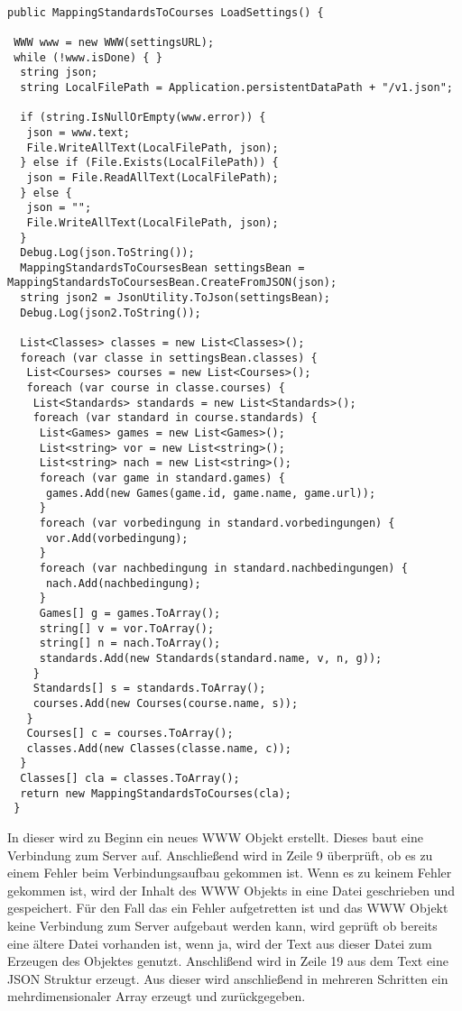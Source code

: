 \begin{scriptsize}
\lstset{
	float,
	caption=Methode LoadSettings, 
	language=[Sharp]C, 
	frame=single,  
	showstringspaces=false, 
	showspaces=false, 
	numbers=left, 
	captionpos=b, 
	belowcaptionskip=4pt,
	basicstyle=\ttfamily
} 
\begin{lstlisting}[label=lst:methode3]

public MappingStandardsToCourses LoadSettings() {

 WWW www = new WWW(settingsURL);
 while (!www.isDone) { }
  string json;
  string LocalFilePath = Application.persistentDataPath + "/v1.json";

  if (string.IsNullOrEmpty(www.error)) {
   json = www.text;
   File.WriteAllText(LocalFilePath, json);
  } else if (File.Exists(LocalFilePath)) {
   json = File.ReadAllText(LocalFilePath);
  } else {
   json = "";                
   File.WriteAllText(LocalFilePath, json);
  }
  Debug.Log(json.ToString());
  MappingStandardsToCoursesBean settingsBean = MappingStandardsToCoursesBean.CreateFromJSON(json);
  string json2 = JsonUtility.ToJson(settingsBean);
  Debug.Log(json2.ToString());

  List<Classes> classes = new List<Classes>();
  foreach (var classe in settingsBean.classes) {
   List<Courses> courses = new List<Courses>();
   foreach (var course in classe.courses) {
    List<Standards> standards = new List<Standards>();
    foreach (var standard in course.standards) {
     List<Games> games = new List<Games>();
     List<string> vor = new List<string>();
     List<string> nach = new List<string>();
     foreach (var game in standard.games) {
      games.Add(new Games(game.id, game.name, game.url));
     }
     foreach (var vorbedingung in standard.vorbedingungen) {
      vor.Add(vorbedingung);
     }
     foreach (var nachbedingung in standard.nachbedingungen) {
      nach.Add(nachbedingung);
     }
     Games[] g = games.ToArray();
     string[] v = vor.ToArray();
     string[] n = nach.ToArray();
     standards.Add(new Standards(standard.name, v, n, g));
    }
    Standards[] s = standards.ToArray();
    courses.Add(new Courses(course.name, s));
   }
   Courses[] c = courses.ToArray();
   classes.Add(new Classes(classe.name, c));
  }
  Classes[] cla = classes.ToArray();
  return new MappingStandardsToCourses(cla);
 }
\end{lstlisting}
\end{scriptsize}

In dieser wird zu Beginn ein neues WWW Objekt erstellt. Dieses baut eine Verbindung zum Server auf. Anschließend wird in Zeile 9 überprüft, ob es zu einem Fehler beim Verbindungsaufbau gekommen ist. Wenn es zu keinem Fehler gekommen ist, wird der Inhalt des WWW Objekts in eine Datei geschrieben und gespeichert. Für den Fall das ein Fehler aufgetretten ist und das WWW Objekt keine Verbindung zum Server aufgebaut werden kann, wird geprüft ob bereits eine ältere Datei vorhanden ist, wenn ja, wird der Text aus dieser Datei zum Erzeugen des Objektes genutzt. Anschlißend wird in Zeile 19 aus dem Text eine JSON Struktur erzeugt. Aus dieser wird anschließend in mehreren Schritten ein mehrdimensionaler Array erzeugt und zurückgegeben.
